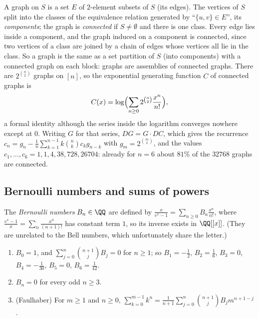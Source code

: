 \begin{example}\label{generating-functions:example-connected-graphs}
A graph on $S$ is a set $E$ of $2$-element subsets of $S$ (its edges). The vertices of $S$ split into the classes of the equivalence relation generated by ``$\{u, v\} \in E$'', its \emph{components};
the graph is \emph{connected} if $S \neq \emptyset$ and there is one class. Every edge lies inside a component, and the graph induced on a component is connected, since two vertices of a class are
joined by a chain of edges whose vertices all lie in the class. So a graph is the same as a set partition of $S$ (into components) with a connected graph on each block: graphs are assemblies of
connected graphs. There are $2^{\binom{n}{2}}$ graphs on $[n]$, so the exponential generating function $C$ of connected graphs is
\[
C(x) = \log\Bigl(\sum_{n \geq 0}2^{\binom{n}{2}}\frac{x^n}{n!}\Bigr),
\]
a formal identity although the series inside the logarithm converges nowhere except at $0$. Writing $G$ for that series, $DG = G \cdot DC$, which gives the recurrence
$c_n = g_n - \frac{1}{n}\sum_{k=1}^{n-1}k\binom{n}{k}c_kg_{n-k}$ with $g_m = 2^{\binom{m}{2}}$, and the values $c_1, \ldots, c_6 = 1, 1, 4, 38, 728, 26704$: already for $n = 6$ about $81\%$ of the $32768$ graphs are connected.
\end{example}

\subsection{Bernoulli numbers and sums of powers}\label{generating-functions:subsection-bernoulli}

\begin{definition}\label{generating-functions:definition-bernoulli}
The \emph{Bernoulli numbers} $B_n \in \QQ$ are defined by $\frac{x}{e^x - 1} = \sum_{n \geq 0}B_n\frac{x^n}{n!}$, where $\frac{e^x - 1}{x} = \sum_n\frac{x^n}{(n + 1)!}$ has constant term $1$, so its
inverse exists in $\QQ[[x]]$. (They are unrelated to the Bell numbers, which unfortunately share the letter.)
\end{definition}

\begin{proposition}\label{generating-functions:proposition-bernoulli}
\begin{enumerate}
\item $B_0 = 1$, and $\sum_{j=0}^{n}\binom{n + 1}{j}B_j = 0$ for $n \geq 1$; so $B_1 = -\frac12$, $B_2 = \frac16$, $B_3 = 0$, $B_4 = -\frac1{30}$, $B_5 = 0$, $B_6 = \frac1{42}$.
\item $B_n = 0$ for every odd $n \geq 3$.
\item (Faulhaber) For $m \geq 1$ and $n \geq 0$, $\displaystyle\sum_{k=0}^{m-1}k^n = \frac{1}{n + 1}\sum_{j=0}^{n}\binom{n + 1}{j}B_jm^{n+1-j}$.
\end{enumerate}
\end{proposition}

